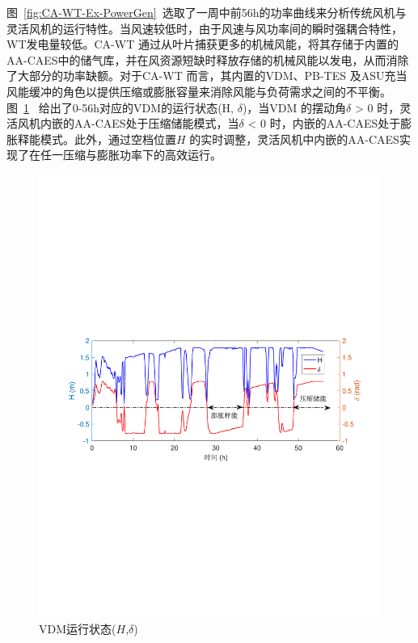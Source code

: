 图~\ref{fig:CA-WT-Ex-PowerGen}~选取了一周中前56h的功率曲线来分析传统风机与灵活风机的运行特性。当风速较低时，由于风速与风功率间的瞬时强耦合特性，WT发电量较低。CA-WT 通过从叶片捕获更多的机械风能，将其存储于内置的AA-CAES中的储气库，并在风资源短缺时释放存储的机械风能以发电，从而消除了大部分的功率缺额。对于CA-WT 而言，其内置的VDM、PB-TES 及ASU充当风能缓冲的角色以提供压缩或膨胀容量来消除风能与负荷需求之间的不平衡。图~\ref{fig:CA-WT-Ex-VDM}~ 给出了0-56h对应的VDM的运行状态(H, $\delta$)，当VDM 的摆动角$\delta$ > 0 时，灵活风机内嵌的AA-CAES处于压缩储能模式，当$\delta$ < 0 时，内嵌的AA-CAES处于膨胀释能模式。此外，通过空档位置$H$ 的实时调整，灵活风机中内嵌的AA-CAES实现了在任一压缩与膨胀功率下的高效运行。

\begin{figure}[H] %
  \centering
  \includegraphics[scale=0.63]{figures/Chap5-15-CA-WT-Ex-VDM.pdf}
  \caption{VDM运行状态($H$,$\delta$)}
  \label{fig:CA-WT-Ex-VDM}
\end{figure}

